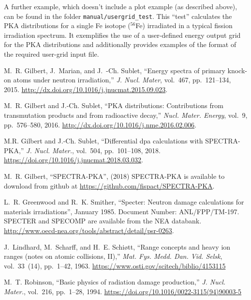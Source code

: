\documentclass[a4paper]{article}
\begin{document}
A further example, which doesn't include a plot example (as described above), can be found in the folder \texttt{manual/usergrid\_test}. This ``test'' calculates the PKA distributions for a single Fe isotope (\(^{56}\)Fe) irradiated in a typical fission irradiation spectrum. It exemplifies the use of a user-defined energy output grid for the PKA distributions and additionally provides examples of the format of the required user-grid input file.

\begin{thebibliography}{10}

M.~R. Gilbert, J.~Marian, and J.~{\relax -Ch}. Sublet, ``Energy spectra of
  primary knock-on atoms under neutron irradiation,'' {\em J. Nucl. Mater},
  vol.~467, pp.~121--134, 2015.
\newblock \url{http://dx.doi.org/10.1016/j.jnucmat.2015.09.023}.

M.~R. Gilbert and J.-{\relax Ch}. Sublet, ``{{PKA distributions: Contributions
  from transmutation products and from radioactive decay}},'' {\em Nucl. Mater.
  Energy}, vol.~9, pp.~576--580, 2016.
    \newblock \url{http://dx.doi.org/10.1016/j.nme.2016.02.006}.






M.R. Gilbert and J.-Ch. Sublet, ``{{Differential dpa calculations with
  SPECTRA-PKA}},'' {\em J. Nucl. Mater.}, vol.~504, pp.~101--108, 2018.
    \newblock \url{https://doi.org/10.1016/j.jnucmat.2018.03.032}.

M.~R. Gilbert, ``{SPECTRA-PKA}'',  (2018) {SPECTRA-PKA is available to download
  from github at \url{https://github.com/fispact/SPECTRA-PKA}}.

L.~R. Greenwood and R.~K. Smither,
  ``Specter: Neutron damage calculations for materials
  irradiations'', January 1985. Document Number:
  ANL/FPP/TM-197. SPECTER and SPECOMP are available from the NEA databank.
\newblock \url{http://www.oecd-nea.org/tools/abstract/detail/psr-0263}.



J.~Lindhard, M.~Scharff, and H.~E. Schi{\o}tt,
  ``{{Range concepts and heavy
  ion ranges (notes on atomic collisions, {II})}},'' {\em Mat. Fys. Medd. Dan. Vid.
  Selsk}, vol.~33~(14), pp.~1--42, 1963.
\newblock\url{https://www.osti.gov/scitech/biblio/4153115}

M.~T. Robinson, ``{{Basic physics of radiation damage production}},'' {\em J. Nucl. Mater.}, vol.~216, pp.~1--28, 1994.
\newblock
  \url{https://doi.org/10.1016/0022-3115(94)90003-5}



\end{thebibliography}
\end{document}
